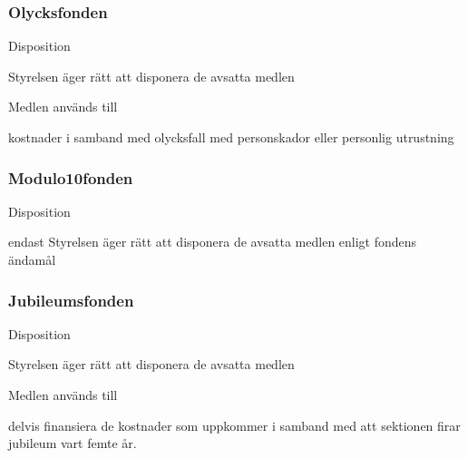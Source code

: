 \documentclass[10pt]{article}
\begin{document}
\subsubsection{Olycksfonden}
\begin{emptylist}
\item Disposition
    \begin{dashlist}
    \item Styrelsen äger rätt att disponera de avsatta medlen
    \end{dashlist}
\end{emptylist}
\begin{emptylist}
\item Medlen används till
    \begin{dashlist}
    \item kostnader i samband med olycksfall med personskador eller personlig
        utrustning
    \end{dashlist}
\end{emptylist}

\subsubsection{Modulo10fonden}
\begin{emptylist}
\item Disposition
    \begin{dashlist}
    \item endast Styrelsen äger rätt att disponera de avsatta medlen enligt
        fondens ändamål
    \end{dashlist}
\end{emptylist}

\subsubsection{Jubileumsfonden}
\begin{emptylist}
\item Disposition
    \begin{dashlist}
    \item Styrelsen äger rätt att disponera de avsatta medlen
    \end{dashlist}
\end{emptylist}
\begin{emptylist}
\item Medlen används till
    \begin{dashlist}
    \item delvis finansiera de kostnader som uppkommer i samband med att sektionen firar jubileum vart femte år.
    \end{dashlist}
\end{emptylist}
\end{document}
